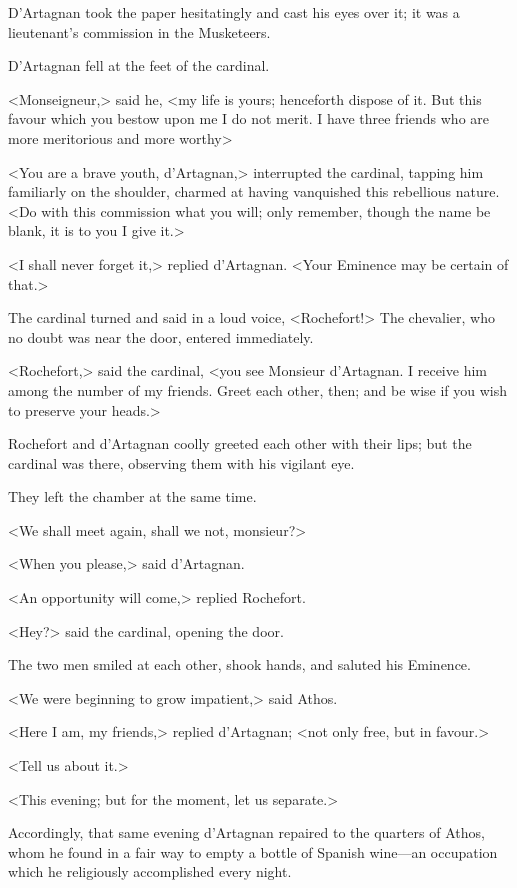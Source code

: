 D'Artagnan took the paper hesitatingly and cast his eyes over it; it was a lieutenant's commission in the Musketeers. 

D'Artagnan fell at the feet of the cardinal. 

<Monseigneur,> said he, <my life is yours; henceforth dispose of it. But this favour which you bestow upon me I do not merit. I have three friends who are more meritorious and more worthy\longdash> 

<You are a brave youth, d'Artagnan,> interrupted the cardinal, tapping him familiarly on the shoulder, charmed at having vanquished this rebellious nature. <Do with this commission what you will; only remember, though the name be blank, it is to you I give it.> 

<I shall never forget it,> replied d'Artagnan. <Your Eminence may be certain of that.> 

The cardinal turned and said in a loud voice, <Rochefort!> The chevalier, who no doubt was near the door, entered immediately. 

<Rochefort,> said the cardinal, <you see Monsieur d'Artagnan. I receive him among the number of my friends. Greet each other, then; and be wise if you wish to preserve your heads.> 

Rochefort and d'Artagnan coolly greeted each other with their lips; but the cardinal was there, observing them with his vigilant eye. 

They left the chamber at the same time. 

<We shall meet again, shall we not, monsieur?> 

<When you please,> said d'Artagnan. 

<An opportunity will come,> replied Rochefort. 

<Hey?> said the cardinal, opening the door. 

The two men smiled at each other, shook hands, and saluted his Eminence. 

<We were beginning to grow impatient,> said Athos. 

<Here I am, my friends,> replied d'Artagnan; <not only free, but in favour.> 

<Tell us about it.> 

<This evening; but for the moment, let us separate.> 

Accordingly, that same evening d'Artagnan repaired to the quarters of Athos, whom he found in a fair way to empty a bottle of Spanish wine---an occupation which he religiously accomplished every night. 

